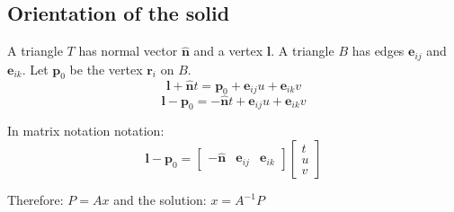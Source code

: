 



\subsection{Orientation of the solid}
A triangle $T$ has normal vector $\mathbf{\hat n}$ and a vertex $\mathbf l$. A triangle $B$ has edges $\mathbf e_{ij}$ and $\mathbf e_{ik}$. Let $\mathbf p_0$ be the vertex $\mathbf r_i$ on $B$.
$$ \mathbf l + \mathbf{\hat n}t = \mathbf p_0 + \mathbf e_{ij}u + \mathbf e_{ik}v $$
$$ \mathbf l - \mathbf p_0 =  -\mathbf{\hat n}t + \mathbf e_{ij}u + \mathbf e_{ik}v $$

In matrix notation notation:
$$ \mathbf l - \mathbf p_0 = 
 \begin{bmatrix}
  -\mathbf{\hat n} & \mathbf e_{ij} & \mathbf e_{ik}
 \end{bmatrix}
 \begin{bmatrix}
  t \\
  u \\
  v
 \end{bmatrix}
$$

Therefore: $P = Ax$ and the solution: $x = A^{-1} P$

